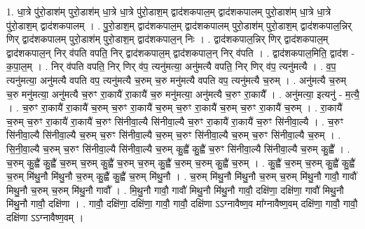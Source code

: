 \documentclass[17pt]{extarticle}
\begin{document}
1. धा॒त्रे पु॑रो॒डाश॑म् पुरो॒डाश॑म् धा॒त्रे धा॒त्रे पु॑रो॒डाश॒म् द्वाद॑शकपाल॒म् द्वाद॑शकपालम् पुरो॒डाश॑म् धा॒त्रे धा॒त्रे पु॑रो॒डाश॒म् द्वाद॑शकपालम् । . पु॒रो॒डाश॒म् द्वाद॑शकपाल॒म् द्वाद॑शकपालम् पुरो॒डाश॑म् पुरो॒डाश॒म् द्वाद॑शकपाल॒न्निर् णिर् द्वाद॑शकपालम् पुरो॒डाश॑म् पुरो॒डाश॒म् द्वाद॑शकपाल॒न् निः । . द्वाद॑शकपाल॒न्निर् णिर् द्वाद॑शकपाल॒म् द्वाद॑शकपाल॒न् निर् व॑पति वपति॒ निर् द्वाद॑शकपाल॒म् द्वाद॑शकपाल॒न् निर् व॑पति । . द्वाद॑शकपाल॒मिति॒ द्वाद॑श - क॒पा॒ल॒म् । . निर् व॑पति वपति॒ निर् णिर् व॑प॒ त्यनु॑मत्या॒ अनु॑मत्यै वपति॒ निर् णिर् व॑प॒ त्यनु॑मत्यै । . व॒प॒ त्यनु॑मत्या॒ अनु॑मत्यै वपति वप॒ त्यनु॑मत्यै च॒रुम् च॒रु मनु॑मत्यै वपति वप॒ त्यनु॑मत्यै च॒रुम् । . अनु॑मत्यै च॒रुम् च॒रु मनु॑मत्या॒ अनु॑मत्यै च॒रुꣳ रा॒कायै॑ रा॒कायै॑ च॒रु मनु॑मत्या॒ अनु॑मत्यै च॒रुꣳ रा॒कायै᳚ । . अनु॑मत्या॒ इत्यनु॑ - म॒त्यै॒ । . च॒रुꣳ रा॒कायै॑ रा॒कायै॑ च॒रुम् च॒रुꣳ रा॒कायै॑ च॒रुम् च॒रुꣳ रा॒कायै॑ च॒रुम् च॒रुꣳ रा॒कायै॑ च॒रुम् । . रा॒कायै॑ च॒रुम् च॒रुꣳ रा॒कायै॑ रा॒कायै॑ च॒रुꣳ सि॑नीवा॒ल्यै सि॑नीवा॒ल्यै च॒रुꣳ रा॒कायै॑ रा॒कायै॑ च॒रुꣳ सि॑नीवा॒ल्यै । . च॒रुꣳ सि॑नीवा॒ल्यै सि॑नीवा॒ल्यै च॒रुम् च॒रुꣳ सि॑नीवा॒ल्यै च॒रुम् च॒रुꣳ सि॑नीवा॒ल्यै च॒रुम् च॒रुꣳ सि॑नीवा॒ल्यै च॒रुम् । . सि॒नी॒वा॒ल्यै च॒रुम् च॒रुꣳ सि॑नीवा॒ल्यै सि॑नीवा॒ल्यै च॒रुम् कु॒ह्वै॑ कु॒ह्वै॑ च॒रुꣳ सि॑नीवा॒ल्यै सि॑नीवा॒ल्यै च॒रुम् कु॒ह्वै᳚ । . च॒रुम् कु॒ह्वै॑ कु॒ह्वै॑ च॒रुम् च॒रुम् कु॒ह्वै॑ च॒रुम् च॒रुम् कु॒ह्वै॑ च॒रुम् च॒रुम् कु॒ह्वै॑ च॒रुम् । . कु॒ह्वै॑ च॒रुम् च॒रुम् कु॒ह्वै॑ कु॒ह्वै॑ च॒रुम् मि॑थु॒नौ मि॑थु॒नौ च॒रुम् कु॒ह्वै॑ कु॒ह्वै॑ च॒रुम् मि॑थु॒नौ । . च॒रुम् मि॑थु॒नौ मि॑थु॒नौ च॒रुम् च॒रुम् मि॑थु॒नौ गावौ॒ गावौ॑ मिथु॒नौ च॒रुम् च॒रुम् मि॑थु॒नौ गावौ᳚ । . मि॒थु॒नौ गावौ॒ गावौ॑ मिथु॒नौ मि॑थु॒नौ गावौ॒ दक्षि॑णा॒ दक्षि॑णा॒ गावौ॑ मिथु॒नौ मि॑थु॒नौ गावौ॒ दक्षि॑णा । . गावौ॒ दक्षि॑णा॒ दक्षि॑णा॒ गावौ॒ गावौ॒ दक्षि॑णा ऽऽग्नावैष्ण॒व मा᳚ग्नावैष्ण॒वम् दक्षि॑णा॒ गावौ॒ गावौ॒ दक्षि॑णा ऽऽग्नावैष्ण॒वम् । \newline
\end{document}
